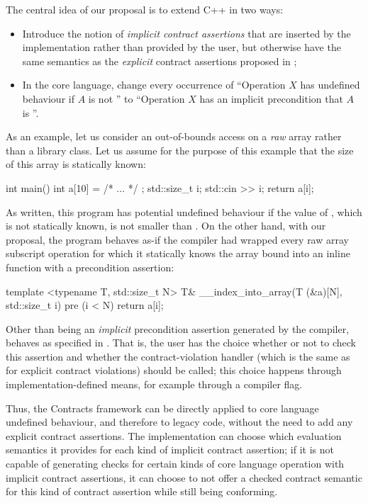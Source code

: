 The central idea of our proposal is to extend C++ in two ways:
\begin{itemize}
\item Introduce the notion of \emph{implicit contract assertions} that are inserted by the implementation rather than provided by the user, but otherwise have the same semantics as the \emph{explicit} contract assertions proposed in \cite{P2900R8};
\item In the core language, change every occurrence of ``Operation $X$ has undefined behaviour if $A$ is not '' to ``Operation $X$ has an implicit precondition that $A$ is ''.
\end{itemize}
As an example, let us consider an out-of-bounds access on a \emph{raw} array rather than a library class. Let us assume for the purpose of this example that the size  of this array is statically known:
\begin{codeblock}
int main() {
  int a[10] = { /* ... */ };
  std::size_t i; std::cin >> i;
  return a[i];
}
\end{codeblock}
As written, this program has potential undefined behaviour if the value of , which is not statically known, is not smaller than . On the other hand, with our proposal, the program behaves as-if the compiler had wrapped every raw array subscript operation for which it statically knows the array bound  into an inline function with a precondition assertion:
\begin{codeblock}
template <typename T, std::size_t N>
T& __index_into_array(T (&a)[N], std::size_t i) 
pre (i < N) {
  return a[i];
}
\end{codeblock}
Other than being an \emph{implicit} precondition assertion generated by the compiler,  behaves as specified in \cite{P2900R8}. That is, the user has the choice whether or not to check this assertion and whether the contract-violation handler (which is the same as for explicit contract violations) should be called; this choice happens through implementation-defined means, for example through a compiler flag. 

Thus, the Contracts framework can be directly applied to core language undefined behaviour, and therefore to legacy code, without the need to add any explicit contract assertions. The implementation can choose which evaluation semantics it provides for each kind of implicit contract assertion; if it is not capable of generating checks for certain kinds of core language operation with implicit contract assertions, it can choose to not offer a checked contract semantic for this kind of contract assertion while still being conforming.

